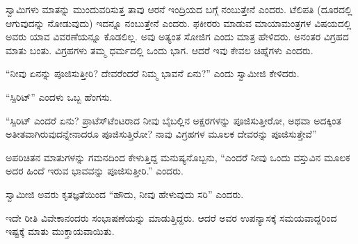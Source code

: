 \vskip 3pt

ಸ್ವಾಮಿಗಳು ಮಾತನ್ನು ಮುಂದುವರಿಸುತ್ತ ತಾವು ಆರನೆ ಇಂದ್ರಿಯದ ಬಗ್ಗೆ ನಂಬುತ್ತೇನೆ ಎಂದರು. ಟೆಲಿಪತಿ (ದೂರದಲ್ಲಿ ಆಗುವುದನ್ನು ನೋಡುವುದು) ಇದನ್ನೂ ನಂಬುತ್ತೇನೆ ಎಂದರು. ಫಕೀರರು ಮಾಡುವ ಮಾಯಾಮಂತ್ರಗಳ ವಿಷಯದಲ್ಲಿ ಅವರು ಯಾವ ವಿವರಣೆಯನ್ನೂ ಕೊಡಲಿಲ್ಲ. ಅವು ಅತ್ಯಂತ ಸೋಜಿಗ ಎಂದು ಮಾತ್ರ ಹೇಳಿದರು. ಅನಂತರ ವಿಗ್ರಹದ ಮಾತು ಬಂತು. ವಿಗ್ರಹಗಳು ತಮ್ಮ ಧರ್ಮದಲ್ಲಿ ಒಂದು ಭಾಗ. ಆದರೆ ಇವು ಕೇವಲ ಚಿಹ್ನೆಗಳು ಎಂದರು.

\vskip 3pt

“ನೀವು ಏನನ್ನು ಪೂಜಿಸುತ್ತೀರಿ? ದೇವರೆಂದರೆ ನಿಮ್ಮ ಭಾವನೆ ಏನು?” ಎಂದು ಸ್ವಾಮೀಜಿ ಕೇಳಿದರು.

\vskip 3pt

“ಸ್ಪಿರಿಟ್​” ಎಂದಳು ಒಬ್ಬ ಹೆಂಗಸು.

\eject

“ಸ್ಪಿರಿಟ್​ ಎಂದರೆ ಏನು? ಪ್ರಾಟೆಸ್​ಟೆಂಟರಾದ ನೀವು ಬೈಬಲ್ಲಿನ ಅಕ್ಷರಗಳನ್ನು ಪೂಜಿಸುತ್ತೀರೋ, ಅಥವಾ ಅದಕ್ಕಿಂತ ಅತೀತವಾಗಿರುವುದನ್ನೇನಾದರೂ ಪೂಜಿಸುತ್ತಿರೋ? ನಾವು ವಿಗ್ರಹಗಳ ಮೂಲಕ ದೇವರನ್ನು ಪೂಜಿಸುತ್ತೇವೆ”

\vskip 3pt

ಅಪರಿಚಿತನ ಮಾತುಗಳನ್ನು ಗಮನದಿಂದ ಕೇಳುತ್ತಿದ್ದ ಮನುಷ್ಯನೊಬ್ಬನು, “ಎಂದರೆ ನೀವು ಒಂದು ವಸ್ತುವಿನ ಮೂಲಕ ಅದರ ಹಿಂದೆ ಇರುವ ಭಾವವನ್ನು ಪೂಜಿಸುತ್ತೀರಿ.” ಎಂದರು.

\vskip 3pt

ಸ್ವಾಮೀಜಿ ಅವರು ಕೃತಜ್ಞತೆಯಿಂದ “ಹೌದು, ನೀವು ಹೇಳುವುದು ಸರಿ” ಎಂದರು.

\vskip 3pt

ಇದೇ ರೀತಿ ವಿವೇಕಾನಂದರು ಸಂಭಾಷಣೆಯನ್ನು ಮಾಡುತ್ತಿದ್ದರು. ಆದರೆ ಅವರ ಉಪನ್ಯಾಸಕ್ಕೆ ಸಮಯವಾದ್ದರಿಂದ ಇಷ್ಟಕ್ಕೆ ಮಾತು ಮುಕ್ತಾಯವಾಯಿತು.

